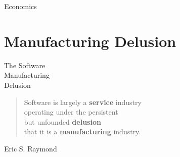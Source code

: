 \documentclass[18pt]{beamer}
\begin{document}
{
\begin{frame}[plain]
\fontsize{72pt}{90pt}\selectfont
\center
\begin{center}
Economics
\end{center}
\end{frame}
}

\section{Manufacturing Delusion}

{
\color{white}
\begin{frame}[plain]
\fontsize{36pt}{36pt}\selectfont
\center
\begin{center}
The Software\\
Manufacturing\\
Delusion
\end{center}
\end{frame}
}


\begin{frame}[plain]
\fontsize{18pt}{18pt}\selectfont
\center
\begin{quote}
Software is largely a \textbf{service} industry\\
operating under the persistent\\
but unfounded \textbf{delusion}\\
that it is a \textbf{manufacturing} industry.\\
\end{quote}
\bigskip
\begin{flushright}
Eric S. Raymond
\end{flushright}
\end{frame}


{
\begin{frame}[plain]
\end{frame}
}
\end{document}
